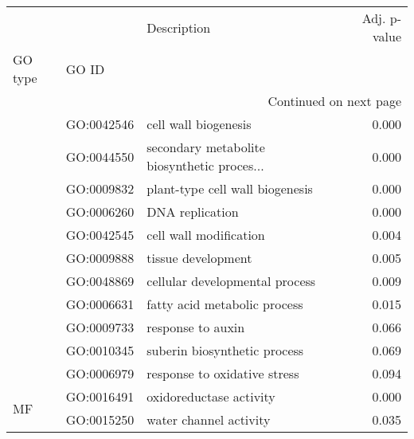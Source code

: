 \begin{longtable}{lllr}
\toprule
   &            &                                  Description &  Adj. p-value \\
GO type & GO ID &                                              &               \\
\midrule
\endhead
\midrule
\multicolumn{4}{r}{{Continued on next page}} \\
\midrule
\endfoot

\bottomrule
\endlastfoot
\multirow{11}{*}{BP} & GO:0042546 &                         cell wall biogenesis &         0.000 \\
   & GO:0044550 &  secondary metabolite biosynthetic proces... &         0.000 \\
   & GO:0009832 &              plant-type cell wall biogenesis &         0.000 \\
   & GO:0006260 &                              DNA replication &         0.000 \\
   & GO:0042545 &                       cell wall modification &         0.004 \\
   & GO:0009888 &                           tissue development &         0.005 \\
   & GO:0048869 &               cellular developmental process &         0.009 \\
   & GO:0006631 &                 fatty acid metabolic process &         0.015 \\
   & GO:0009733 &                            response to auxin &         0.066 \\
   & GO:0010345 &                 suberin biosynthetic process &         0.069 \\
   & GO:0006979 &                 response to oxidative stress &         0.094 \\
\cline{1-4}
\multirow{2}{*}{MF} & GO:0016491 &                      oxidoreductase activity &         0.000 \\
   & GO:0015250 &                       water channel activity &         0.035 \\
\end{longtable}
